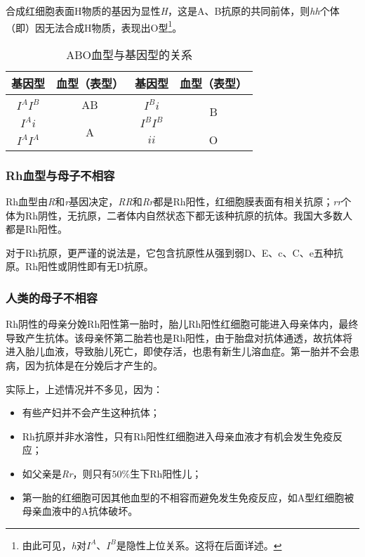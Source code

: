 合成红细胞表面H物质的基因为显性\textit{H}，这是A、B抗原的共同前体，则\textit{hh}个体（即）因无法合成H物质，表现出O型\footnote{由此可见，\textit{h}对$I^{A}$、$I^{B}$是隐性上位关系。这将在后面详述。}。

\begin{table}[h!]
	\centering
	\begin{tabular}{|c|c||c|c|}
		\hline
		基因型          & 血型（表型）             & 基因型          & 血型（表型）             \\ \hline
		$I^{A}I^{B}$ & AB                 & $I^{B}i$     & \multirow{2}{*}{B} \\ \cline{1-3}
		$I^{A}i$     & \multirow{2}{*}{A} & $I^{B}I^{B}$ &                    \\ \cline{1-1} \cline{3-4}
		$I^{A}I^{A}$ &                    & $ii$         & O                  \\ \hline
	\end{tabular}
	\caption{ABO血型与基因型的关系}
	\label{tab:ABObloodType}
\end{table}

\subsubsection{Rh血型与母子不相容}

Rh血型由\textit{R}和\textit{r}基因决定，\textit{RR}和\textit{Rr}都是Rh阳性，红细胞膜表面有相关抗原；\textit{rr}个体为Rh阴性，无抗原，二者体内自然状态下都无该种抗原的抗体。我国大多数人都是Rh阳性。

对于Rh抗原，更严谨的说法是，它包含抗原性从强到弱D、E、c、C、e五种抗原。Rh阳性或阴性即有无D抗原。
\subsubsection{人类的母子不相容}

Rh阴性的母亲分娩Rh阳性第一胎时，胎儿Rh阳性红细胞可能进入母亲体内，最终导致产生抗体。该母亲怀第二胎若也是Rh阳性，由于胎盘对抗体通透，故抗体将进入胎儿血液，导致胎儿死亡，即使存活，也患有新生儿溶血症。第一胎并不会患病，因为抗体是在分娩后才产生的。

实际上，上述情况并不多见，因为：
\begin{itemize}
	\item 有些产妇并不会产生这种抗体；
	\item Rh抗原并非水溶性，只有Rh阳性红细胞进入母亲血液才有机会发生免疫反应；
	\item 如父亲是\textit{Rr}，则只有$50\%$生下Rh阳性儿；
	\item 第一胎的红细胞可因其他血型的不相容而避免发生免疫反应，如A型红细胞被母亲血液中的A抗体破坏。
\end{itemize}

